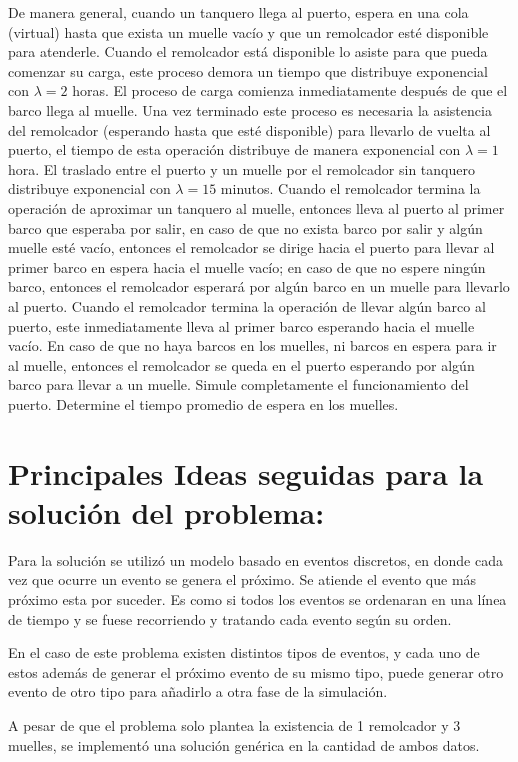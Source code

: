 \documentclass[titlepage,11pt]{scrartcl}
\begin{document}
	De manera general, cuando un tanquero llega al puerto, espera en una cola (virtual) hasta que exista un muelle vacío y que un remolcador esté disponible para atenderle. Cuando el remolcador está disponible lo asiste para que pueda comenzar su carga, este proceso demora un tiempo que distribuye exponencial con $\lambda = 2$ horas. El proceso de carga comienza inmediatamente después de que el barco llega al muelle. Una vez terminado este proceso es necesaria la asistencia del remolcador (esperando hasta que esté disponible) para llevarlo de vuelta al puerto, el tiempo de esta operación distribuye de manera exponencial con $\lambda = 1$ hora. El traslado entre el puerto y un muelle por el remolcador sin tanquero distribuye exponencial con $\lambda = 15$ minutos. Cuando el remolcador termina la operación de aproximar un tanquero al muelle, entonces lleva al puerto al primer barco que esperaba por salir, en caso de que no exista barco por salir y algún muelle esté vacío, entonces el remolcador se dirige hacia el puerto para llevar al primer barco en espera hacia el muelle vacío; en caso de que no espere ningún barco, entonces el remolcador esperará por algún barco en un muelle para llevarlo al puerto. Cuando el remolcador termina la operación de llevar algún barco al puerto, este inmediatamente lleva al primer barco esperando hacia el muelle vacío. En caso de que no haya barcos en los muelles, ni barcos en espera para ir al muelle, entonces el remolcador se queda en el puerto esperando por algún barco para llevar a un muelle. Simule completamente el funcionamiento del puerto. Determine el tiempo promedio de espera en los muelles.

\section{Principales Ideas seguidas para la solución del problema:}

	Para la solución se utilizó un modelo basado en eventos discretos, en donde cada vez que ocurre un evento se genera el próximo. Se atiende el evento que más próximo esta por suceder. Es como si todos los eventos se ordenaran en una línea de tiempo y se fuese recorriendo y tratando cada evento según su orden.

	En el caso de este problema existen distintos tipos de eventos, y cada uno de estos además de generar el próximo evento de su mismo tipo, puede generar otro evento de otro tipo para añadirlo a otra fase de la simulación.

	A pesar de que el problema solo plantea la existencia de 1 remolcador y 3 muelles, se implementó una solución genérica en la cantidad de ambos datos.
\end{document}
